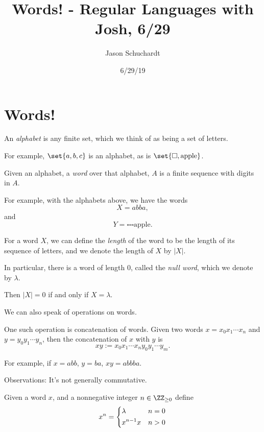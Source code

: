 \documentclass{article}
\title{Words! - Regular Languages with Josh, 6/29}
\date{6/29/19}
\author{Jason Schuchardt}
\theoremstyle{remark}
\begin{document}
\maketitle

\section{Words!}

\begin{definition}
    An \emph{alphabet} is any finite set, which we think of as being a set of letters.

    For example, $\set{a,b,c}$ is an alphabet, as is $\set{\square, \text{apple}}$.
\end{definition}

\begin{definition}
    Given an alphabet, a \emph{word} over that alphabet, $A$ is
    a finite sequence with digits in $A$.

    For example, with the alphabets above, we have the words
    \[ X = abba, \]
    and 
    \[ Y = \square\square\square \text{apple}.\]
\end{definition}

\begin{definition}
    For a word $X$, we can define the \emph{length} of the word 
    to be the length of its sequence of letters, and 
    we denote the length of $X$ by $|X|$.

    In particular, there is a word of length $0$, called the
    \emph{null word}, which we denote by $\lambda$.

    Then $|X|=0$ if and only if $X=\lambda$.
\end{definition}

We can also speak of operations on words.

One such operation is concatenation of words. Given two words 
$x=x_0x_1\cdots x_n$ and
$y=y_0y_1\cdots y_n$, then the concatenation of $x$ with $y$ is 
\[ xy := x_0x_1\cdots x_ny_0y_1\cdots y_m. \]

For example, if $x=abb$, $y=ba$, $xy=abbba$. 

Observations: It's not generally commutative.

\begin{definition}
    Given a word $x$, and a nonnegative integer $n\in \ZZ_{\ge 0}$
    define 
    \[ x^n =\begin{dcases}
    \lambda & n = 0\\
    x^{n-1}x & n > 0 \\
    \end{dcases} \]
\end{definition}
\end{document}
